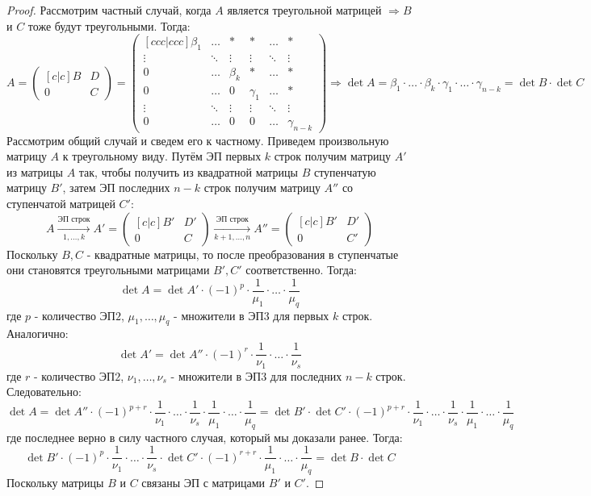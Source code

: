 \documentclass[12pt]{article}
\theoremstyle{definition}
\begin{document}
\begin{proof}
	Рассмотрим частный случай, когда $A$ является треугольной матрицей $\Rightarrow B$ и $C$ тоже будут треугольными. Тогда:
	$$
		A = 	
		\begin{pmatrix}[c|c]
			B & D\\ \hline
			0 & C
		\end{pmatrix} =
		\begin{pmatrix}[ccc|ccc]
			\beta_1  & \dotsc & * & * & \dotsc & *\\
			\vdots  & \ddots & \vdots & \vdots & \ddots & \vdots\\
			0  & \dotsc & \beta_k & * & \dotsc & *\\ \hline
			0  & \dotsc & 0 & \gamma_1 & \dotsc & *\\
			\vdots  & \ddots & \vdots & \vdots & \ddots & \vdots\\
			0  & \dotsc & 0 & 0 & \dotsc & \gamma_{n-k}
		\end{pmatrix} \Rightarrow \det{A} = \beta_1{\cdot}\dotsc{\cdot}\beta_k{\cdot}\gamma_1{\cdot}\dotsc{\cdot}\gamma_{n-k} = \det{B}{\cdot}\det{C}
	$$
	Рассмотрим общий случай и сведем его к частному. Приведем произвольную матрицу $A$ к треугольному виду. Путём ЭП первых $k$ строк получим матрицу $A'$ из матрицы $A$ так, чтобы получить из квадратной матрицы $B$ ступенчатую матрицу $B'$, затем ЭП последних $n-k$ строк получим матрицу $A''$ со ступенчатой матрицей $C'$:
	$$
		A \xrightarrow[1,\dotsc, k]{\text{ЭП строк}} A' = 		
		\begin{pmatrix}[c|c]
			B' & D'\\ \hline
			0 & C
		\end{pmatrix} \xrightarrow[k+1,\dotsc, n]{\text{ЭП строк}} A'' = 		
		\begin{pmatrix}[c|c]
			B' & D'\\ \hline
			0 & C'
		\end{pmatrix}
	$$
	Поскольку $B,C$ - квадратные матрицы, то после преобразования в ступенчатые они становятся треугольными матрицами $B',C'$ соответственно. Тогда:
	$$
		\det{A} = \det{A'}{\cdot}(-1)^p{\cdot}\dfrac{1}{\mu_1}{\cdot}\dotsc{\cdot}\dfrac{1}{\mu_q}
	$$
	где $p$ - количество ЭП$2$, $\mu_1,\dotsc, \mu_q$ - множители в ЭП$3$ для первых $k$ строк. Аналогично: 
	$$
		\det{A'} = \det{A''}{\cdot}(-1)^r{\cdot}\dfrac{1}{\nu_1}{\cdot}\dotsc{\cdot}\dfrac{1}{\nu_s}
	$$
	где $r$ - количество ЭП$2$, $\nu_1,\dotsc, \nu_s$ - множители в ЭП$3$ для последних $n-k$ строк. Следовательно:
	$$
		\det{A} = \det{A''}{\cdot}(-1)^{p +r}{\cdot}\dfrac{1}{\nu_1}{\cdot}\dotsc{\cdot}\dfrac{1}{\nu_s}{\cdot}\dfrac{1}{\mu_1}{\cdot}\dotsc{\cdot}\dfrac{1}{\mu_q} = \det{B'}{\cdot}\det{C'}{\cdot}(-1)^{p +r}{\cdot}\dfrac{1}{\nu_1}{\cdot}\dotsc{\cdot}\dfrac{1}{\nu_s}{\cdot}\dfrac{1}{\mu_1}{\cdot}\dotsc{\cdot}\dfrac{1}{\mu_q}
	$$
	где последнее верно в силу частного случая, который мы доказали ранее. Тогда:
	$$
		\det{B'}{\cdot}(-1)^{p}{\cdot}\dfrac{1}{\nu_1}{\cdot}\dotsc{\cdot}\dfrac{1}{\nu_s}{\cdot}\det{C'}{\cdot}(-1)^{r +r}{\cdot}\dfrac{1}{\mu_1}{\cdot}\dotsc{\cdot}\dfrac{1}{\mu_q} = \det{B}{\cdot}\det{C}
	$$
	Поскольку матрицы $B$ и $C$ связаны ЭП с матрицами $B'$ и $C'$.
\end{proof}
\end{document}
